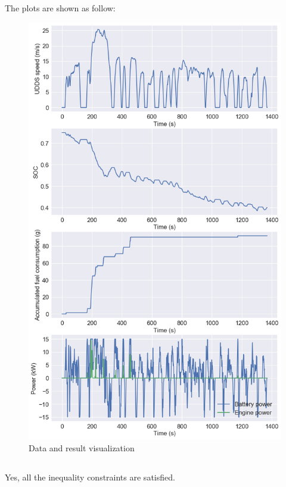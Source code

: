 \documentclass[12pt]{article}
\begin{document}
\subsection{}
The plots are shown as follow:
\begin{figure}[H]
	\centering
	\includegraphics[width=12cm]{6c.png} 
	\caption{Data and result visualization}
\end{figure}
\subsection{}
Yes, all the inequality constraints are satisfied.
\end{document}
